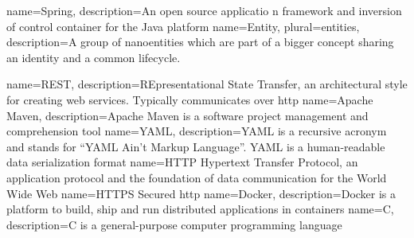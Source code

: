 {
  name={Spring},
  description={An open source applicatio	n framework and inversion of control container for the Java platform}
}
{
	name={Entity},
	plural={entities},
	description={A group of nanoentities which are part of a bigger concept sharing an identity and a common lifecycle.\cite{evans2003domain}}
}

{
  name={REST},
  description={REpresentational State Transfer, an architectural style for creating web services. Typically communicates over \gls{http}}
}
{
  name={Apache Maven},
  description={Apache Maven is a software project management and comprehension tool}
}
{
  name={YAML},
  description={YAML is a recursive acronym and stands for \enquote{YAML Ain't Markup Language}. YAML is a human-readable data serialization format}
}
{
  name={HTTP}
}
{
	Hypertext Transfer Protocol, an application protocol and the foundation of data communication for the World Wide Web \cite{http_wikipedia}
}
{
  name={HTTPS}
}
{
	Secured \gls{http}
}
{
  name={Docker},
  description={Docker is a platform to build, ship and run distributed applications in containers}
}
{
  name={C},
  description={C is a general-purpose computer programming language}
}
